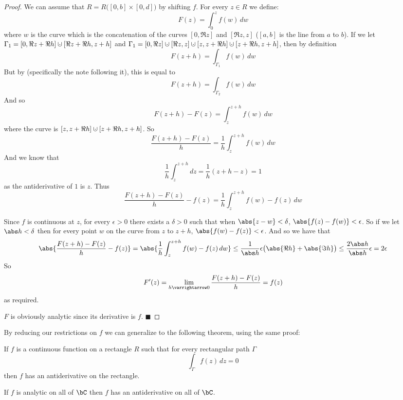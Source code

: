 \documentclass[10pt]{article}
\let\to=\varrightarrow
\def\qed{\hskip1cm\hbox{}\hfill$\blacksquare$}
\begin{document}
\begin{proof}

    We can assume that $R=R\bigl([0,b]\times[0,d]\bigr)$ by shifting $f$.
    For every $z\in R$ we define:
    \[ F(z) = \int_0^z f(w)\,dw \]
    where $w$ is the curve which is the concatenation of the curves $[0,\Re z]$ and $[\Re z,z]$ ($[a,b]$ is the line from $a$ to $b$).
    If we let $\Gamma_1=[0,\Re z+\Re h]\dcup[\Re z+\Re h,z+h]$ and $\Gamma_1=[0,\Re z]\dcup[\Re z,z]\dcup[z,z+\Re h]\dcup[z+\Re h,z+h]$,
    then by definition
    \[ F(z+h) = \int_{\Gamma_1} f(w)\,dw \]
    But by  (specifically the note following it), this is equal to
    \[ F(z+h) = \int_{\Gamma_2} f(w)\,dw \]
    And so
    \[ F(z+h) - F(z) = \int_z^{z+h} f(w)\,dw \]
    where the curve is $[z,z+\Re h]\dcup[z+\Re h,z+h]$.
    So
    \[ \frac{F(z+h) - F(z)}h = \frac1h\int_z^{z+h}f(w)\,dw \]
    And we know that
    \[ \frac1h\int_z^{z+h}dz = \frac1h(z+h-z) = 1 \]
    as the antiderivative of $1$ is $z$.
    Thus
    \[ \frac{F(z+h) - F(z)}h - f(z) = \frac1h\int_z^{z+h} f(w) - f(z)\,dw \]

    Since $f$ is continuous at $z$, for every $\epsilon>0$ there exists a $\delta>0$ such that when $\abs{z-w}<\delta$, $\abs{f(z)-f(w)}<\epsilon$.
    So if we let $\abs h<\delta$ then for every point $w$ on the curve from $z$ to $z+h$, $\abs{f(w)-f(z)}<\epsilon$.
    And so we have that
    \[ \abs{\frac{F(z+h) - F(z)}h - f(z)} = \abs{\frac1h\int_z^{z+h} f(w) - f(z)\,dw} \leq \frac1{\abs h}\epsilon\bigl(\abs{\Re h}+\abs{\Im h}\bigr) \leq \frac{2\abs h}{\abs h}\epsilon = 2\epsilon \]
    So
    \[ F'(z) = \lim_{h\to0}\frac{F(z+h) - F(z)}h = f(z) \]
    as required.

    $F$ is obviously analytic since its derivative is $f$.
    \qed

\end{proof}

By reducing our restrictions on $f$ we can generalize to the following theorem, using the same proof:

\begin{thrm*}

    If $f$ is a continuous function on a rectangle $R$ such that for every rectangular path $\Gamma$
    \[ \int_\Gamma f(z)\,dz = 0 \]
    then $f$ has an antiderivative on the rectangle.

\end{thrm*}

\begin{coro*}

    If $f$ is analytic on all of $\bC$ then $f$ has an antiderivative on all of $\bC$.

\end{coro*}
\end{document}
